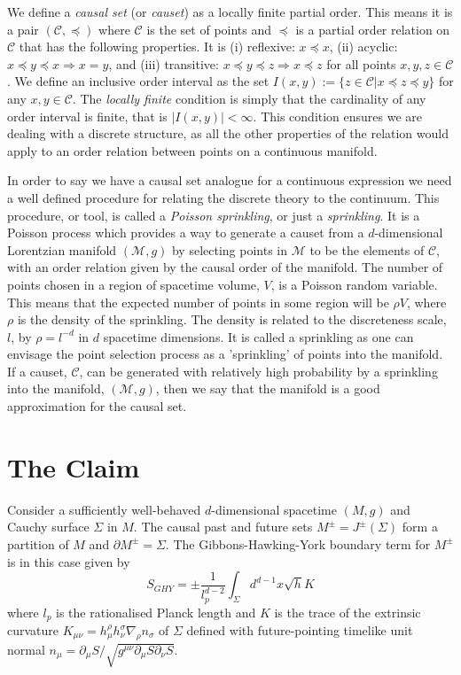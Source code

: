 \documentclass[12pt]{article}
\newcommand{\be}{\begin{equation}}
\newcommand{\ee}{\end{equation}}
\begin{document}
We define a \textit{causal set} (or \textit{causet}) as a locally finite partial order. This means it is a pair $(\mathcal{C},\preceq)$ where $\mathcal{C}$ is the set of points and $\preceq$ is a partial order relation on $\mathcal{C}$ that has the following properties. It is (i) reflexive: $x\preceq x$, (ii) acyclic: $x\preceq y\preceq x \Rightarrow x=y$, and (iii) transitive: $x\preceq y\preceq z \Rightarrow x\preceq z$ for all points $x, y, z \in \mathcal{C}$. We define an inclusive order interval as the set $I(x,y):=\lbrace z\in\mathcal{C}|x\preceq z\preceq y\rbrace$ for any $x, y\in\mathcal{C}$. The \textit{locally finite} condition is simply that the cardinality of any order interval is finite, that is $|I(x,y)|<\infty$. This condition ensures we are dealing with a discrete structure, as all the other properties of the relation would apply to an order relation between points on a continuous manifold.

In order to say we have a causal set analogue for a continuous expression we need a well defined procedure for relating the discrete theory to the continuum. This procedure, or tool, is called a \textit{Poisson sprinkling}, or just a \textit{sprinkling}. It is a Poisson process which provides a way to generate a causet from a $d$-dimensional Lorentzian manifold $(\mathcal{M},g)$ by selecting points in $\mathcal{M}$ to be the elements of $\mathcal{C}$, with an order relation given by the causal order of the manifold. The number of points chosen in a region of spacetime volume, $V$, is a Poisson random variable. This means that the expected number of points in some region will be $\rho V$, where $\rho$ is the density of the sprinkling. The density is related to the discreteness scale, $l$, by $\rho=l^{-d}$ in $d$ spacetime dimensions. It is called a sprinkling as one can envisage the point selection process as a 'sprinkling' of points into the manifold. If a causet, $\mathcal{C}$, can be generated with relatively high probability by a sprinkling into the manifold, $(\mathcal{M},g)$, then we say that the manifold is a good approximation for the causal set.

\section{The Claim}

Consider a sufficiently well-behaved $d$-dimensional spacetime $(M,g)$ and Cauchy surface $\Sigma$ in $M$. The causal past and future sets $M^\pm=J^\pm(\Sigma)$ form a partition of $M$ and $\partial M^\pm = \Sigma$. The Gibbons-Hawking-York boundary term for $M^\pm$ is in this case given by
\be\label{eq:GHYBT_in_continuum}
S_{GHY} = \pm \frac{1}{l_p^{d-2}}\int_{\Sigma} d^{d-1}x \sqrt{h} K
\ee
where $l_p$ is the rationalised Planck length and $K$ is the trace of the extrinsic curvature $K_{\mu\nu}=h_{\mu}^\rho h_\nu^\sigma \nabla_\rho n_\sigma$ of $\Sigma$ defined with future-pointing timelike unit normal $n_{\mu}=\partial_\mu S/\sqrt{g^{\mu\nu}\partial_\mu S\partial_\nu S}$. 
\end{document}
